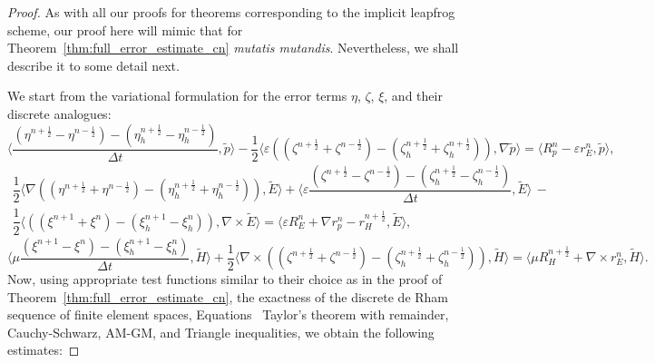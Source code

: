 \documentclass{amsart}
\theoremstyle{thmstyleone}%
\theoremstyle{thmstyletwo}%
\theoremstyle{thmstylethree}%
\newcommand{\aInnerproduct}[2]{\bigl\langle #1, #2 \bigr\rangle}
\begin{document}
\begin{proof}
  As with all our proofs for theorems corresponding to the implicit leapfrog scheme, our proof here will mimic that for Theorem~\ref{thm:full_error_estimate_cn} \textit{mutatis mutandis}. Nevertheless, we shall describe it to some detail next.

  We start from the variational formulation for the error terms $\eta$, $\zeta$, $\xi$, and their discrete analogues: 
\[
  \aInnerproduct{\dfrac{\left(\eta^{n + \frac{1}{2}} - \eta^{n - \frac{1}{2}}\right) - \left( \eta^{n + \frac{1}{2}}_h - \eta^{n - \frac{1}{2}}_h \right)}{\Delta t}}{\widetilde{p}}  - \dfrac{1}{2} \aInnerproduct{ \varepsilon \left( \left( \zeta^{n + \frac{1}{2}} + \zeta^{n - \frac{1}{2}} \right) - \left(\zeta_h^{n + \frac{1}{2}} + \zeta^{n + \frac{1}{2}}_h \right) \right)}{\nabla \widetilde{p}} =  \aInnerproduct{R_p^n - \varepsilon r_E^n}{\widetilde{p}},
\]
\vspace{-1em}\begin{multline*}
  \dfrac{1}{2} \aInnerproduct{\nabla \left( \left( \eta^{n + \frac{1}{2}} + \eta^{n - \frac{1}{2}} \right) - \left( \eta^{n + \frac{1}{2}}_h + \eta^{n - \frac{1}{2}}_h \right) \right)}{\widetilde{E}} + \aInnerproduct{\varepsilon \dfrac{\left( \zeta^{n + \frac{1}{2}} - \zeta^{n - \frac{1}{2}} \right) - \left(\zeta^{n + \frac{1}{2}}_h - \zeta^{n - \frac{1}{2}}_h \right)}{\Delta t}}{\widetilde{E}} \, - \\
  \dfrac{1}{2} \aInnerproduct{\left( \left( \xi^{n + 1} + \xi^{n} \right) - \left(\xi^{n + 1}_h - \xi^{n}_h \right) \right)}{\nabla \times \widetilde{E}} = \aInnerproduct{\varepsilon R_E^n + \nabla r_p^n - r_H^{n + \frac{1}{2}}}{\widetilde{E}},
\end{multline*}
\vspace{-1em}
\[
  \aInnerproduct{\mu \dfrac{\left(\xi^{n + 1} - \xi^{n} \right) - \left( \xi^{n + 1}_h - \xi^{n}_h \right)}{\Delta t}}{\widetilde{H}}  + \dfrac{1}{2} \aInnerproduct{\nabla \times \left( \left( \zeta^{n + \frac{1}{2}} + \zeta^{n - \frac{1}{2}} \right) - \left( \zeta^{n + \frac{1}{2}}_h + \zeta^{n - \frac{1}{2}}_h \right) \right)}{\widetilde{H}} = \aInnerproduct{\mu R_H^{n + \frac{1}{2}} + \nabla \times r_E^n}{\widetilde{H}}.
\]
Now, using appropriate test functions similar to their choice as in the proof of Theorem~\ref{thm:full_error_estimate_cn}, the exactness of the discrete de Rham sequence of finite element spaces, Equations~ Taylor's theorem with remainder, Cauchy-Schwarz, AM-GM, and Triangle inequalities, we obtain the following estimates:

\end{proof}
\end{document}
